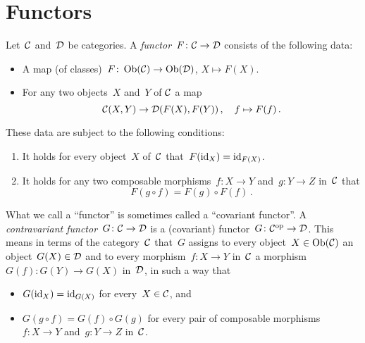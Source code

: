 \section{Functors}


\begin{definition}
  Let~$\mathcal{C}$ and~$\mathcal{D}$ be categories.
  A \emph{functor}~$F \colon \mathcal{C} \to \mathcal{D}$ consists of the following data:
  \begin{itemize}
    \item
      A map (of classes)~$F \colon \operatorname{Ob}(\mathcal{C}) \to \operatorname{Ob}(\mathcal{D})$, $X \mapsto F(X)$.
    \item
      For any two objects~$X$ and~$Y$ of $\mathcal{C}$ a map
      \[
                \mathcal{C}(X, Y)
        \to     \mathcal{D}(F(X), F(Y)) \,,
        \quad   f
        \mapsto F(f) \,.
      \]
  \end{itemize}
  These data are subject to the following conditions:
  \begin{enumerate}[label=(F\arabic*)]
    \item
      It holds for every object~$X$ of~$\mathcal{C}$ that~$F(\mathrm{id}_X) = \mathrm{id}_{F(X)}$.
    \item
      It holds for any two composable morphisms~$f \colon X \to Y$ and~$g \colon Y \to Z$ in~$\mathcal{C}$ that
      \[
          F(g \circ f)
        = F(g) \circ F(f) \,.
      \]
  \end{enumerate}
\end{definition}


\begin{remark}
  What we call a \enquote{functor} is sometimes called a \enquote{covariant functor}.
  A \emph{contravariant functor}~$G \colon \mathcal{C} \to \mathcal{D}$ is a (covariant) functor~$G \colon \mathcal{C}^{\mathrm{op}} \to \mathcal{D}$.
  This means in terms of the category~$\mathcal{C}$ that~$G$ assigns to every object~$X \in \operatorname{Ob}(\mathcal{C})$ an object~$G(X) \in \mathcal{D}$ and to every morphism~$f \colon X \to Y$ in~$\mathcal{C}$ a morphism~$G(f) \colon G(Y) \to G(X)$ in~$\mathcal{D}$, in such a way that
  \begin{itemize}
    \item
      $G(\mathrm{id}_X) = \mathrm{id}_{G(X)}$ for every~$X \in \mathcal{C}$, and
    \item
      $G(g \circ f) = G(f) \circ G(g)$ for every pair of composable morphisms~$f \colon X \to Y$ and~$g \colon Y \to Z$ in~$\mathcal{C}$.
  \end{itemize}
\end{remark}


